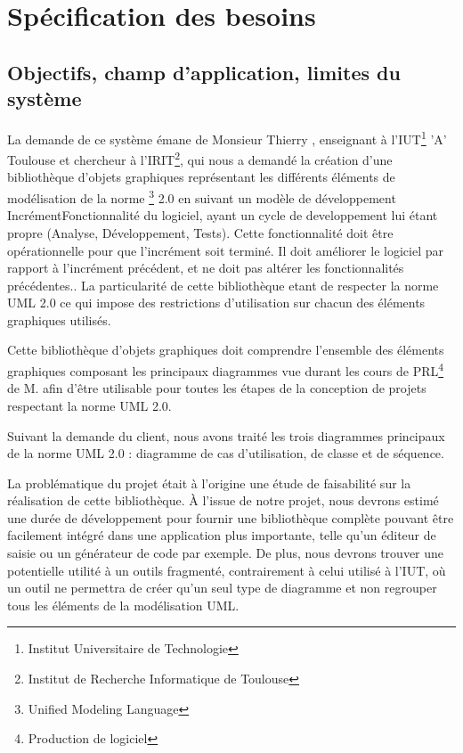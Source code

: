 \documentclass[12pt,a4paper,openany]{report}
\begin{document}
	\maketitle
	\newpage
	\tableofcontents
	\newpage
	\chapter{Spécification des besoins}
	\section{Objectifs, champ d'application, limites du système}
	La demande de ce système émane de Monsieur Thierry , enseignant à l'IUT\footnote{Institut Universitaire de Technologie}
	'A' Toulouse et chercheur à l'IRIT\footnote{Institut de Recherche Informatique de Toulouse},
	qui nous a demandé la création d'une bibliothèque d'objets graphiques représentant
	les différents éléments de modélisation de la norme 
	\footnote{Unified Modeling Language} 2.0 en suivant un modèle de développement 
	{Incrément}{Fonctionnalité du logiciel, ayant un cycle de developpement lui étant propre (Analyse, Développement, Tests).
	Cette fonctionnalité doit être opérationnelle pour que l'incrément soit terminé. Il doit améliorer le logiciel
	par rapport à l'incrément précédent, et ne doit pas altérer les fonctionnalités précédentes.}.
	La particularité de cette bibliothèque etant de respecter la norme UML 2.0 ce qui impose des restrictions
	d'utilisation sur chacun des éléments graphiques utilisés.

	Cette bibliothèque d'objets graphiques doit comprendre l'ensemble des éléments graphiques composant
	les principaux diagrammes vue durant les cours de PRL\footnote{Production de logiciel} de M.  afin
	d'être utilisable pour toutes les étapes de la conception de projets respectant la norme UML 2.0.
	
	Suivant la demande du client, nous avons traité les trois diagrammes principaux de la norme UML 2.0 :
	diagramme de cas d'utilisation, de classe et de séquence.

	La problématique du projet était à l'origine une étude de faisabilité sur la réalisation de cette bibliothèque.
	À l'issue de notre projet, nous devrons estimé une durée de développement pour fournir une bibliothèque complète
	pouvant être facilement intégré dans une application plus importante, telle qu'un éditeur de saisie ou un générateur de code par exemple.
	De plus, nous devrons trouver une potentielle utilité à un outils fragmenté, contrairement à celui utilisé à l'IUT,
	où un outil ne permettra de créer qu'un seul type de diagramme et non regrouper tous les éléments de la modélisation UML.
\end{document}
